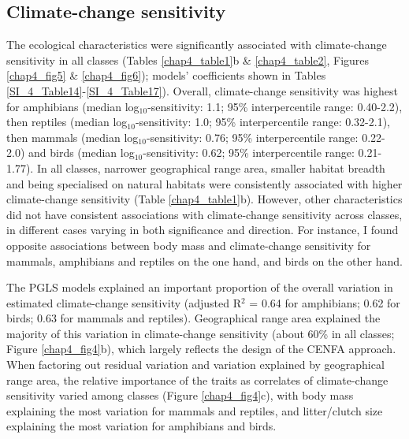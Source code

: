 \clearpage
\pagebreak
\subsection{Climate-change sensitivity}
The ecological characteristics were significantly associated with climate-change sensitivity in all classes (Tables \ref{chap4_table1}b \& \ref{chap4_table2}, Figures \ref{chap4_fig5} \& \ref{chap4_fig6}); models' coefficients shown in Tables \ref{SI_4_Table14}-\ref{SI_4_Table17}). Overall, climate-change sensitivity was highest for amphibians (median log$_{10}$-sensitivity: 1.1; 95\% interpercentile range: 0.40-2.2), then reptiles (median log$_{10}$-sensitivity: 1.0; 95\% interpercentile range: 0.32-2.1), then mammals (median log$_{10}$-sensitivity: 0.76; 95\% interpercentile range: 0.22-2.0) and birds (median log$_{10}$-sensitivity: 0.62; 95\% interpercentile range: 0.21-1.77). In all classes, narrower geographical range area, smaller habitat breadth and being specialised on natural habitats were consistently associated with higher climate-change sensitivity (Table \ref{chap4_table1}b). However, other characteristics did not have consistent associations with climate-change sensitivity across classes, in different cases varying in both significance and direction. For instance, I found opposite associations between body mass and climate-change sensitivity for mammals, amphibians and reptiles on the one hand, and birds on the other hand. 


The PGLS models explained an important proportion of the overall variation in estimated climate-change sensitivity (adjusted R$^2$ = 0.64 for amphibians; 0.62 for birds; 0.63 for mammals and reptiles). Geographical range area explained the majority of this variation in climate-change sensitivity (about 60\% in all classes; Figure \ref{chap4_fig4}b), which largely reflects the design of the CENFA approach. When factoring out residual variation and variation explained by geographical range area, the relative importance of the traits as correlates of climate-change sensitivity varied among classes (Figure \ref{chap4_fig4}c), with body mass explaining the most variation for mammals and reptiles, and litter/clutch size explaining the most variation for amphibians and birds.

